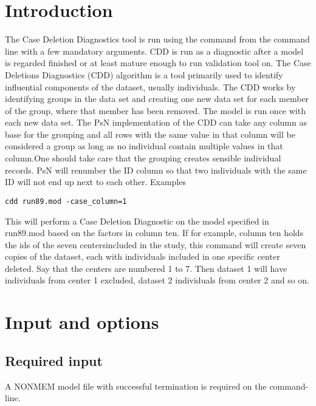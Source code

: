 




\maketitle
\newcommand{\guidetoolname}{cdd}


\section{Introduction}
The Case Deletion Diagnostics tool is run using the command from the command line with a few mandatory arguments. 
CDD is run as a diagnostic after a model is regarded finished or at least mature enough to run validation tool on. 
The Case Deletions Diagnostics (CDD) algorithm is a tool primarily used to identify influential components of the dataset, 
usually individuals. The CDD works by identifying groups in the data set and creating one new data set for each member 
of the group, where that member has been removed. The model is run once with each new data set. The PsN implementation 
of the CDD can take any column as base for the grouping and all rows with the same value in that column will be considered 
a group as long as no individual contain multiple values in that column.One should take care that the grouping creates sensible 
individual records. PsN will renumber the ID column so that two individuals with the same ID will not end up next to each other.
Examples
\begin{verbatim}
cdd run89.mod -case_column=1
\end{verbatim}
This will perform a Case Deletion Diagnostic on the model specified in run89.mod based on the factors in column ten. If for example, 
column ten holds the ids of the seven centersincluded in the study, this command will create seven copies of the dataset, each with 
individuals included in one specific center deleted. Say that the centers are numbered 1 to 7. Then dataset 1 will have individuals from 
center 1 excluded, dataset 2 individuals from center 2 and so on.
\section{Input and options}

\subsection{Required input}
A NONMEM model file with successful termination is required on the command-line.

